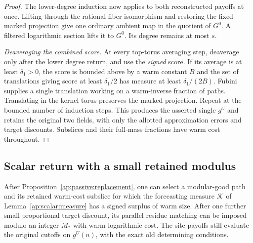 \begin{proof}
The lower-degree induction now applies to both reconstructed
payoffs at once.  Lifting through the rational fiber isomorphism
and restoring the fixed marked projection give one ordinary
ambient map in the quotient of $G^0$.  A filtered logarithmic
section lifts it to $G^0$.  Its degree remains at most $s$.

\emph{Deaveraging the combined score.}
At every top-torus averaging step, deaverage only after the lower
degree return, and use the \emph{signed} score.  If its average is
at least $\delta_1>0$, the score is bounded above by a warm constant
$B$ and the set of translations giving score at least
$\delta_1/2$ has measure at least $\delta_1/(2B)$.
Fubini supplies a single translation working on a warm-inverse
fraction of paths.  Translating in the kernel torus preserves the
marked projection.  Repeat at the bounded number of induction
steps.  This produces the asserted single $g^U$ and retains the
original two fields, with only the allotted approximation errors
and target discounts.  Subslices and their full-mass fractions
have warm cost throughout.
\end{proof}

\subsection{Scalar return with a small retained modulus}

\begin{corollary}
\label{ap:passive:scalar-return}
After Proposition~\ref{ap:passive:replacement}, one can select a
modular-good path and its retained warm-cost subslice for which
the forecasting measure $\mathcal K$ of
Lemma~\ref{ap:scalar:measure} has a signed surplus of warm size.
After one further small proportional target discount, its parallel
residue matching can be imposed modulo an integer $M_*$ with warm
logarithmic cost.  The site payoffs still evaluate the original
cutoffs on $g^U(u)$, with the exact old determining conditions.
\end{corollary}

